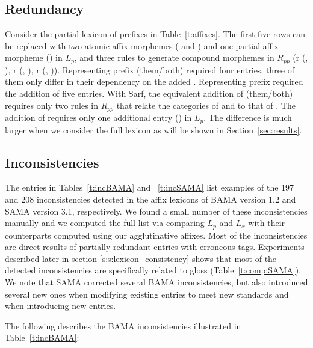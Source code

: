 \subsection{Redundancy} 
\label{s:s:redundant}

Consider the partial lexicon of prefixes in Table~\ref{t:affixes}. 
The first five rows can be replaced with two atomic affix morphemes (  and )  
and one partial affix morpheme () in $L_{p}$, 
and three rules to generate compound morphemes in $R_{pp}$ (r (, ), r (, ), r (, )). 
Representing prefix  (them/both) required four entries, three of them only differ
in their dependency on the added . 
Representing prefix  required the addition of five entries.
With Sarf, the equivalent addition of  (them/both) requires only two rules in $R_{pp}$ that relate the categories of  and  to that of . 
The addition of  requires only one additional entry () in $L_p$.
The difference is much larger when we consider the full lexicon as will be shown 
in Section~\ref{sec:results}.

\subsection{Inconsistencies} 
\label{s:s:inc}

The entries in Tables~\ref{t:incBAMA} and ~\ref{t:incSAMA} list examples of the 197 and 208 inconsistencies detected in the affix 
lexicons of BAMA version 1.2 and SAMA version 3.1, respectively.
We found a small number of these inconsistencies manually and we computed the full list via comparing $L_p$ and $L_x$ with 
their counterparts computed using our agglutinative affixes. 
Most of the inconsistencies are direct results of partially redundant entries with erroneous tags. Experiments described later in section \ref{s:s:lexicon_consistency} shows that most of the detected inconsistencies are specifically related to gloss (Table~\ref{t:comp:SAMA}). 
We note that SAMA corrected several BAMA inconsistencies, but also introduced 
several new ones when modifying existing entries to meet new standards and when introducing new entries. 



The following describes the BAMA inconsistencies illustrated in Table~\ref{t:incBAMA}: 

